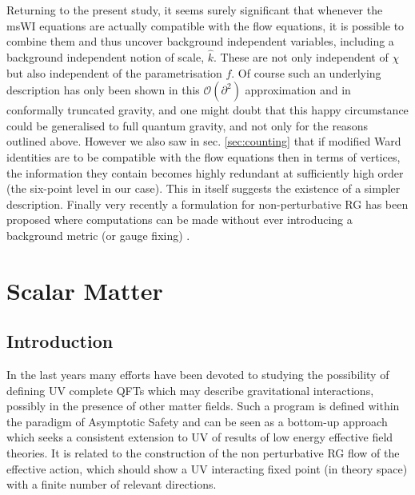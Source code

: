 \documentclass[11pt,draft]{book} %
\newcommand{\hk}{\hat k}
\begin{document}
Returning to the present study, it seems surely significant that
whenever the msWI equations  are actually compatible with the flow equations,
it is possible to combine them and thus uncover background independent variables,
including a background independent notion of scale, $\hk$.
These are not only independent of $\chi$ but also independent of the parametrisation $f$.
Of course such an underlying description has only been shown in this $\mathcal{O}(\partial^2)$ approximation and
in conformally truncated gravity, and one might doubt that this happy circumstance could be generalised to
full quantum gravity, and not only for the reasons outlined above.
However we also saw in sec. \ref{sec:counting} that if modified Ward identities are to be compatible with
the flow equations then in terms of vertices, the information they contain becomes highly redundant
at sufficiently high order (the six-point level in our case).
This in itself suggests the existence of a simpler description.
Finally very recently a formulation for non-perturbative RG has been proposed where computations can be
made without ever introducing a background metric (or gauge fixing) \cite{Morris:2016nda}.




\chapter{Scalar Matter}

\section{Introduction}

In the last years many efforts have been devoted to studying the possibility of defining UV complete QFTs
which may describe gravitational interactions,
possibly in the presence of other matter fields.
Such a program is defined within the paradigm of Asymptotic Safety \cite{Weinberg:1980gg}
and can be seen as a bottom-up approach which seeks a consistent extension
to UV of results of low energy effective field theories.
It is related to the construction of the non perturbative RG flow of the effective action,
which should show a UV interacting fixed point (in theory space)
with a finite number of relevant directions.
\end{document}
